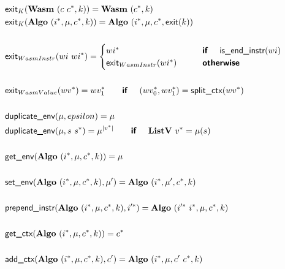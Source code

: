 \begin{align*}
  &\exit_{K}(\wasm ~ (c ~ \seq{c}, k)) = \wasm ~ (\seq{c}, k) \\
  &\exit_{K}(\algo ~ (\seq i, \mu, \seq c, k)) = \algo ~ (\seq i, \mu, \seq c, \exit(k)) \\
%
\newline \\
  &\exit_{WasmInstr}(wi ~ \seq{wi}) =
    \begin{cases}
      \seq{wi} &\quad\quad \premise{if}\quad ~ \isendinstr(wi) \\
      \exit_{WasmInstr}(\seq{wi}) &\quad\quad \premise{otherwise} \\
    \end{cases}
  \\
%
\newline \\
  &\exit_{WasmValue}(\seq{wv}) = \seq{wv_1}
  \quad\quad\premise{if}\quad ~ (\seq{wv_0}, \seq{wv_1}) = \splitctx(\seq{wv}) \\
%
\newline \\
  &\duplicateenv(\mu, epsilon) = \mu \\
  &\duplicateenv(\mu, s ~ \seq{s}) = \mu^{|\seq v|}
  \quad\quad\premise{if}\quad ~ \listv ~ \seq v = \mu(s) \\
%
\newline \\
  &\getenv(\algo ~ (\seq i, \mu, \seq c, k)) = \mu \\
%
\newline \\
  &\setenv(\algo ~ (\seq i, \mu, \seq c, k), \mu') = \algo ~ (\seq i, \mu', \seq c, k) \\
%
\newline \\
  &\prependinstr(\algo ~ (\seq i, \mu, \seq c, k), \seq{i'}) = \algo ~ (\seq{i'} ~ \seq i, \mu, \seq c, k) \\
%
\newline \\
  &\getctx(\algo ~ (\seq i, \mu, \seq c, k)) = \seq c \\
%
\newline \\
  &\addctx(\algo ~ (\seq i, \mu, \seq c, k), c') = \algo ~ (\seq i, \mu, c' ~ \seq c, k) \\
%
\newline \\

\end{align*}
